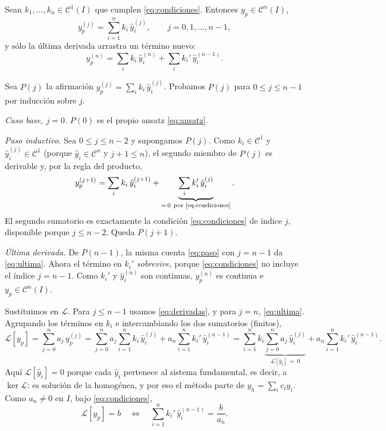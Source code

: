 \documentclass[11pt,twoside]{article}
\newcommand\Lop{\mathcal L}
\newcommand\yh{\hat y}
\newcommand\Cl{\mathcal C}
\begin{document}
\begin{lema}\label{lem:derivadas}
Sean $k_1,\dots,k_n\in\Cl^1(I)$ que cumplen \eqref{eq:condiciones}. Entonces $y_p\in\Cl^n(I)$,
\begin{equation}\label{eq:derivadas}
y_p^{(j)}=\sum_{i=1}^{n}k_i\,\yh_i^{(j)},\qquad j=0,1,\dots,n-1,
\end{equation}
y sólo la última derivada arrastra un término nuevo:
\begin{equation}\label{eq:ultima}
y_p^{(n)}=\sum_ik_i\,\yh_i^{(n)}+\sum_ik_i'\,\yh_i^{(n-1)}.
\end{equation}
\end{lema}

\begin{demostracion}
Sea $P(j)$ la afirmación $y_p^{(j)}=\sum_ik_i\,\yh_i^{(j)}$. Probamos $P(j)$ para $0\le j\le n-1$ por inducción sobre $j$.

\emph{Caso base, $j=0$.} $P(0)$ es el propio ansatz \eqref{eq:ansatz}.

\emph{Paso inductivo.} Sea $0\le j\le n-2$ y supongamos $P(j)$. Como $k_i\in\Cl^1$ y $\yh_i^{(j)}\in\Cl^1$ (porque
$\yh_i\in\Cl^n$ y $j+1\le n$), el segundo miembro de $P(j)$ es derivable y, por la regla del producto,
\begin{equation}\label{eq:paso}
y_p^{(j+1)}=\sum_ik_i\,\yh_i^{(j+1)}+\underbrace{\sum_ik_i'\,\yh_i^{(j)}}_{=\,0\ \text{por \eqref{eq:condiciones}}}.
\end{equation}
El segundo sumatorio es exactamente la condición \eqref{eq:condiciones} de índice $j$, disponible porque $j\le n-2$. Queda $P(j+1)$.

\emph{Última derivada.} De $P(n-1)$, la misma cuenta \eqref{eq:paso} con $j=n-1$ da \eqref{eq:ultima}. Ahora el término en
$k_i'$ \emph{sobrevive}, porque \eqref{eq:condiciones} no incluye el índice $j=n-1$. Como $k_i'$ y $\yh_i^{(n)}$ son
continuas, $y_p^{(n)}$ es continua e $y_p\in\Cl^n(I)$.
\end{demostracion}

Sustituimos en $\Lop$. Para $j\le n-1$ usamos \eqref{eq:derivadas}, y para $j=n$, \eqref{eq:ultima}. Agrupando los
términos en $k_i$ e intercambiando los dos sumatorios (finitos),
\begin{equation*}
\Lop[y_p]=\sum_{j=0}^{n}a_j\,y_p^{(j)}=\sum_{j=0}^{n}a_j\sum_{i=1}^{n}k_i\,\yh_i^{(j)}+a_n\sum_{i=1}^{n}k_i'\,\yh_i^{(n-1)}
=\sum_{i=1}^{n}k_i\underbrace{\sum_{j=0}^{n}a_j\,\yh_i^{(j)}}_{\Lop[\yh_i]\,=\,0}+a_n\sum_{i=1}^{n}k_i'\,\yh_i^{(n-1)}.
\end{equation*}
Aquí $\Lop[\yh_i]=0$ porque cada $\yh_i$ pertenece al sistema fundamental, es decir, a $\ker\Lop$: es solución de la
homogénea, y por eso el método parte de $y_h=\sum_ic_i\yh_i$. Como $a_n\neq0$ en $I$, bajo \eqref{eq:condiciones},
\begin{equation}\label{eq:ultimacond}
\Lop[y_p]=b\quad\Longleftrightarrow\quad\sum_{i=1}^{n}k_i'\,\yh_i^{(n-1)}=\frac{b}{a_n}.
\end{equation}
\end{document}
